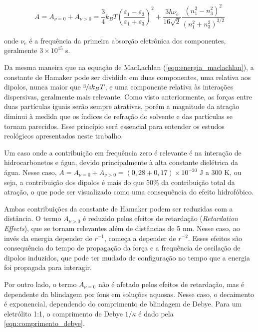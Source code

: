	\begin{equation}
	A = A_{\nu=0} + A_{\nu>0}  = \frac{3}{4} k_BT \left( \frac { \varepsilon_{1}-\varepsilon_{3}} { \varepsilon_{1} + \varepsilon_{3} } \right)^{2} + \frac{3h\nu_{\mathrm{e} } } {16\sqrt{2}} \frac{\left(n_{1}^{2} - n_{3}^{2} \right)^{2}} {\left(n_{1}^{2} + n_{3}^{2} \right)^{3/2} }
	\label{eqn:constante_hamaker_lifshitz}
	\end{equation} 
	
	\noindent onde \(\nu_e\) é a frequência da primeira absorção eletrônica dos componentes, geralmente \(3 \times 10^{15}\) s\menosUm.
	
	Da mesma maneira que na equação de MacLachlan (\autoref{eqn:energia_maclachlan}), a constante de Hamaker pode ser dividida em duas componentes, uma relativa aos dipolos, nunca maior que \(\sfrac{3}{4}k_BT\), e uma componente relativa às interações dispersivas, geralmente mais relevante. Como visto anteriormente, as forças entre duas partículas iguais serão sempre atrativas, porém a magnitude da atração diminui à medida que os índices de refração do solvente e das partículas se tornam parecidos. Esse princípio será essencial para entender os estudos reológicos apresentados neste trabalho.
	
	Um caso onde a contribuição em frequência zero é relevante é na interação de hidrocarbonetos e água, devido principalmente à alta constante dielétrica da água. Nesse caso, \(A = A_{\nu=0} + A_{\nu>0} = (0,28 + 0,17) \times 10^{-20} \) J a 300 K, ou seja, a contribuição dos dipolos é mais do que 50\% da contribuição total da atração, o que pode ser visualizado como uma consequência do efeito hidrofóbico.
	
	Ambas contribuições da constante de Hamaker podem ser reduzidas com a distância. O termo \(A_{\nu > 0}\) é reduzido pelos efeitos de retardação (\emph{Retardation Effects}), que se tornam relevantes além de distâncias de 5 nm. Nesse caso, ao invés da energia depender de \(r^{-1}\), começa a depender de \(r^{-2}\). Esses efeitos são consequência do tempo de propagação da força e a frequência de oscilação de dipolos induzidos, que pode ter mudado de configuração no tempo que a energia foi propagada para interagir.
	
	Por outro lado, o termo \(A_{\nu = 0}\) não é afetado pelos efeitos de retardação, mas é dependente da blindagem por íons em soluções aquosas. Nesse caso, o decaimento é exponencial, dependendo do comprimento de blindagem de Debye. Para um eletrólito 1:1, o comprimento de Debye \(1/\kappa\) é dado pela \autoref{eqn:comprimento_debye}.
	
